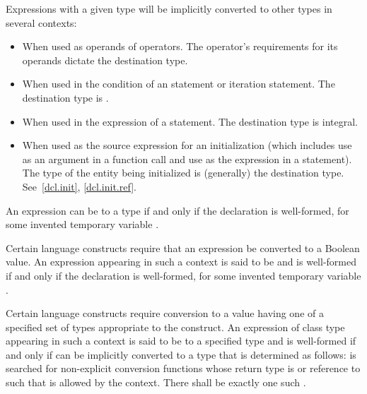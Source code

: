 \pnum
\begin{note}
Expressions with a given type will be implicitly converted to other
types in several contexts:

\begin{itemize}
\item When used as operands of operators. The operator's requirements
for its operands dictate the destination type.

\item When used in the condition of an  statement or
iteration statement. The destination type is
.

\item When used in the expression of a  statement.
The destination type is integral.

\item When used as the source expression for an initialization (which
includes use as an argument in a function call and use as the expression
in a  statement). The type of the entity being initialized
is (generally) the destination type.
See~\ref{dcl.init}, \ref{dcl.init.ref}.
\end{itemize}
\end{note}

\pnum
An expression  can be
 to a type  if and only if the
declaration  is well-formed, for some invented temporary
variable .

\pnum
Certain language constructs require that an expression be converted to a Boolean
value. An expression  appearing in such a context is said to be
 and is well-formed if and only if
the declaration  is well-formed, for some invented temporary
variable .

\pnum
Certain language constructs require conversion to a value having
one of a specified set of types appropriate to the construct. An
expression  of class type  appearing in such a
context is said to be
%
 to a specified type  and is
well-formed if and only if  can be implicitly converted to a type 
that is determined as follows:
 is searched for non-explicit conversion functions
whose return type is \cv{}  or reference to \cv{}
 such that  is allowed by the context.
There shall be exactly one such .

